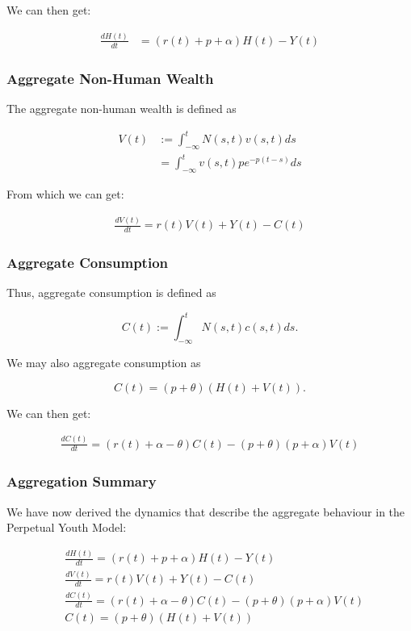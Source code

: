 \documentclass[10pt]{article}
\begin{document}
We can then get:

\begin{align}
    \frac{d H(t)}{d t}&=(r(t)+p+\alpha) H(t)-Y(t)
\end{align}

\subsubsection{Aggregate Non-Human Wealth}

The aggregate non-human wealth is defined as

\begin{align}
    V(t)&:=\int_{-\infty}^t N(s, t) v(s, t) d s \\
    &=\int_{-\infty}^t v(s, t) p e^{-p(t-s)} d s
\end{align}

From which we can get:

\begin{align}
    \frac{d V(t)}{d t}=r(t) V(t)+Y(t)-C(t)
\end{align}

\subsubsection{Aggregate Consumption}

Thus, aggregate consumption is defined as

$$
C(t):=\int_{-\infty}^t N(s, t) c(s, t) d s .
$$

We may also aggregate consumption as

$$
C(t)=(p+\theta)(H(t)+V(t)) .
$$

We can then get:

\begin{align}
    \frac{d C(t)}{d t}=(r(t)+\alpha-\theta) C(t)-(p+\theta)(p+\alpha) V(t)
\end{align}

\subsubsection{Aggregation Summary}

We have now derived the dynamics that describe the aggregate behaviour in the Perpetual Youth Model:

\begin{align}
    & \frac{d H(t)}{d t}=(r(t)+p+\alpha) H(t)-Y(t) \\
    & \frac{d V(t)}{d t}=r(t) V(t)+Y(t)-C(t) \\
    & \frac{d C(t)}{d t}=(r(t)+\alpha-\theta) C(t)-(p+\theta)(p+\alpha) V(t) \\
    &C(t)=(p+\theta)(H(t)+V(t))
\end{align}
\end{document}
